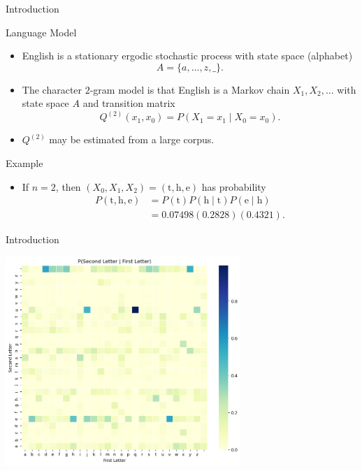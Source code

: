 \documentclass{beamer}
\begin{document}

\begin{frame}{Introduction}

\begin{block}{Language Model \cite{menon2020pattern}}
\begin{itemize}
\item English is a stationary ergodic stochastic process with state space (alphabet)
$$A = \{a, \ldots, z, \_\}.$$
\item The character $2$-gram model is that English is a Markov chain $X_{1}, X_{2}, \ldots$ with state space $A$ and transition matrix 
$$Q^{(2)}(x_{1}, x_{0}) = P(X_{1} = x_{1} \mid X_{0} = x_{0}).$$
\item $Q^{(2)}$ may be estimated from a large corpus.
\end{itemize}
\end{block}

\begin{block}{Example}
\begin{itemize}
\item If $n = 2$, then $(X_{0}, X_{1}, X_{2}) = (\text{t}, \text{h}, \text{e})$ has probability 
\begin{align*}
P(\text{t}, \text{h}, \text{e}) &= P(\text{t}) P(\text{h} \mid \text{t}) P(\text{e} \mid \text{h}) \\
                              &= 0.07498(0.2828)(0.4321).
\end{align*}
\end{itemize}
\end{block}

\end{frame}


\begin{frame}{Introduction}

\begin{center} \includegraphics[width=3.5in]{images/heatmap.png} \end{center}

\end{frame}
\end{document}
